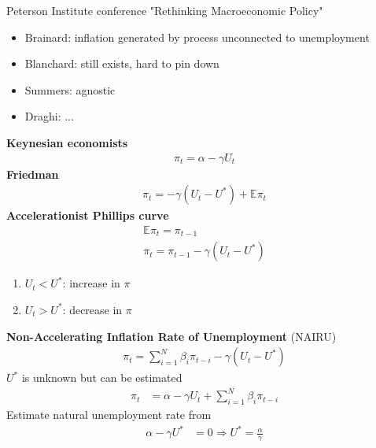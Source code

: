 \documentclass{beamer}
\begin{document}
\begin{frame}
  Peterson Institute conference "Rethinking Macroeconomic Policy"
  \begin{itemize}
    \item Brainard: inflation generated by process unconnected to unemployment
    \item Blanchard: still exists, hard to pin down
    \item Summers: agnostic
    \item Draghi: ...
  \end{itemize}
\end{frame}

\begin{frame}
\textbf{Keynesian economists}
\begin{align}
  \pi_t = \alpha - \gamma U_t
\end{align}
\textbf{Friedman}
 \begin{align}
   \pi_t = -\gamma(U_t-U^*) + \mathbb{E}\pi_t 
 \end{align} 
 \textbf{Accelerationist Phillips curve}
  \begin{align}
    \mathbb{E}\pi_t=\pi_{t-1}\\
    \pi_t=\pi_{t-1} -\gamma(U_t-U^*)
  \end{align}
  \begin{enumerate}
    \item $U _t < U^*$: increase in $\pi$
    \item $U _t > U^*$: decrease in $\pi$
  \end{enumerate}  
\end{frame}

\begin{frame}
\textbf{Non-Accelerating Inflation Rate of Unemployment} (NAIRU)
  \begin{align}
    \pi_t= \sum_{i=1}^N \beta_i\pi_{t-i} -\gamma(U_t-U^*)
  \end{align}  
  $U^*$ is unknown but can be estimated
\begin{align}
  \pi_t &=\alpha - \gamma U_t +\sum_{i=1}^N \beta_i \pi_{t-i}  
\end{align}
 Estimate natural unemployment rate from
 \begin{align}
   \alpha - \gamma U^* &= 0 \Rightarrow  U^* = \frac{\alpha}{\gamma}  
 \end{align}
 \end{frame}
\end{document}
